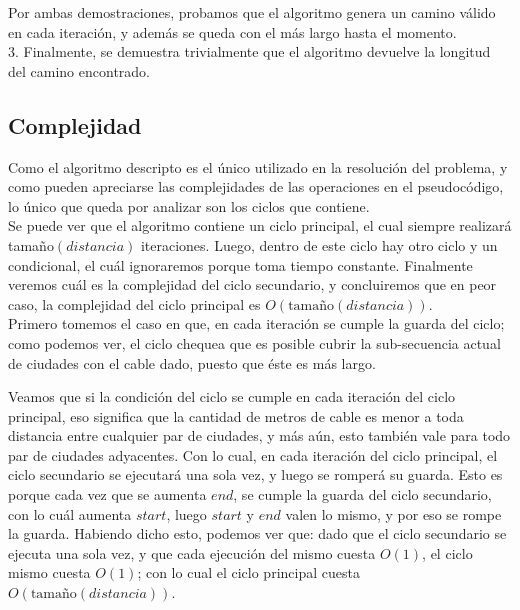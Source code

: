 \documentclass{article}
\theoremstyle{definition}
\theoremstyle{remark}
\begin{document}
Por ambas demostraciones, probamos que el algoritmo genera un camino válido en cada iteración, y además se queda con el más largo hasta el momento. \\

3. Finalmente, se demuestra trivialmente que el algoritmo devuelve la longitud del camino encontrado.


\subsection{Complejidad}
Como el algoritmo descripto es el único utilizado en la resolución del problema, y como pueden apreciarse las complejidades de las operaciones en el pseudocódigo, lo único que queda por analizar son los ciclos que contiene. \\
Se puede ver que el algoritmo contiene un ciclo principal, el cual siempre realizará tamaño$(distancia)$ iteraciones. Luego, dentro de este ciclo hay otro ciclo y un condicional, el cuál ignoraremos porque toma tiempo constante. Finalmente veremos cuál es la complejidad del ciclo secundario, y concluiremos que en peor caso, la complejidad del ciclo principal es $O(\text{tamaño}(distancia))$. \\ 
Primero tomemos el caso en que, en cada iteración se cumple la guarda del ciclo; como podemos ver, el ciclo chequea que es posible cubrir la sub-secuencia actual de ciudades con el cable dado, puesto que éste es más largo.

Veamos que si la condición del ciclo se cumple en cada iteración del ciclo principal, eso significa que la cantidad de metros de cable es menor a toda distancia entre cualquier par de ciudades, y más aún, esto también vale para todo par de ciudades adyacentes. Con lo cual, en cada iteración del ciclo principal, el ciclo secundario se ejecutará una sola vez, y luego se romperá su guarda. Esto es porque cada vez que se aumenta $end$, se cumple la guarda del ciclo secundario, con lo cuál aumenta $start$, luego $start$ y $end$ valen lo mismo, y por eso se rompe la guarda. Habiendo dicho esto, podemos ver que: dado que el ciclo secundario se ejecuta una sola vez, y que cada ejecución del mismo cuesta $O(1)$, el ciclo mismo cuesta $O(1)$; con lo cual el ciclo principal cuesta $O(\text{tamaño}(distancia))$.
\end{document}
